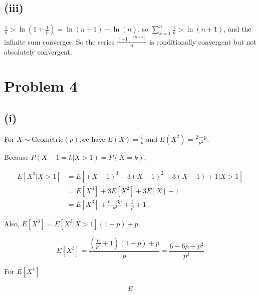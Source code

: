 \documentclass{article}
\begin{document}
\subsection{(iii)}
 
 $\frac 1 n > \ln (1+\frac 1 n) = \ln(n+1) - \ln(n)$, so $\sum_{k=1}^n \frac 1 k  > \ln(n+1)$, and the infinite sum converges. So the series $\frac{(-1)^{(n+1)}}{n}$ is conditionally convergent but not absolutely convergent.

\section{Problem 4}

\subsection{(i)}

For $X\sim\text{Geometric}(p)$,we have $E(X) = \frac {1} {p}$ and $E(X^2) = \frac {2-p}{p^2}$. 

Because $P(X-1=k |X>1) = P(X=k)$, 

\begin{equation}
    \begin{aligned}
        E[X^3|X>1] & = E[(X-1)^3+3(X-1)^2+3(X-1)+1 | X>1] \\
        & = E[X^3] + 3 E[X^2] + 3E[X] + 1 \\
        & = E[X^3] + \frac {6-3p}{p^2} + \frac {3} {p} +1
    \end{aligned}
\end{equation}

Also, $E[X^3] = E[X^3|X>1](1-p) + p$.

\begin{equation}
    E[X^3] = \frac{(\frac{6}{p^2}+1)(1-p)+p}{p} = \frac {6-6p+p^2} {p^3}
\end{equation}

For $E[X^4]$

\begin{equation}
    \begin{aligned}
        E
    \end{aligned}
\end{equation}
\end{document}
